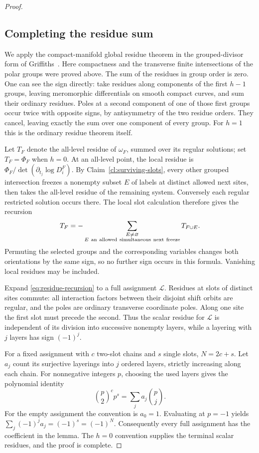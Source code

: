 \begin{proof}
\subsection{Completing the residue sum}

We apply the compact-manifold global residue theorem in the grouped-divisor
form of Griffiths~\cite[Section~III(a), Equation~(3.7)]{Griffiths1976Abel}.
Here compactness and the transverse finite intersections of the polar
groups were proved above. The sum of the residues in group order is zero.
One can see the sign directly: take residues along components of the
first $h-1$ groups, leaving meromorphic differentials on smooth compact
curves, and sum their ordinary residues. Poles at a second component
of one of those first groups occur twice with opposite signs, by
antisymmetry of the two residue orders. They cancel, leaving exactly
the sum over one component of every group. For $h=1$ this is the
ordinary residue theorem itself.

Let $T_F$ denote the all-level residue of $\omega_F$, summed over its
regular solutions; set $T_F=\Phi_F$ when $h=0$. At an all-level point,
the local residue is
$\Phi_F/\det(\partial_{t_j}\log D_i^F)$. By
Claim~\ref{cl:surviving-slots}, every other grouped intersection freezes
a nonempty subset $E$ of labels at distinct allowed next sites, then
takes the all-level residue of the remaining system. Conversely each
regular restricted solution occurs there. The local slot calculation
therefore gives the recursion
\begin{equation}\label{eq:residue-recursion}
 T_F=-\sum_{\substack{E\ne\varnothing\\
          E\ {\rm an\ allowed\ simultaneous\ next\ freeze}}}T_{F\cup E}.
\end{equation}
Permuting the selected groups and the corresponding variables changes
both orientations by the same sign, so no further sign occurs in this
formula. Vanishing local residues may be included.

Expand \eqref{eq:residue-recursion} to a full assignment $\mathcal L$.
Residues at slots of distinct sites commute: all interaction factors
between their disjoint shift orbits are regular, and the poles are
ordinary transverse coordinate poles. Along one site the first slot
must precede the second. Thus the scalar residue for $\mathcal L$ is
independent of its division into successive nonempty layers, while a
layering with $j$ layers has sign $(-1)^j$.

For a fixed assignment with $c$ two-slot chains and $s$ single slots,
$N=2c+s$. Let $a_j$ count its surjective layerings into $j$ ordered
layers, strictly increasing along each chain. For nonnegative integers
$p$, choosing the used layers gives the polynomial identity
\[
 \binom{p}{2}^{c}p^s=\sum_j a_j\binom{p}{j}.
\]
For the empty assignment the convention is $a_0=1$.
Evaluating at $p=-1$ yields
$\sum_j(-1)^j a_j=(-1)^s=(-1)^N$. Consequently every full assignment
has the coefficient in the lemma. The $h=0$ convention supplies the
terminal scalar residues, and the proof is complete.

\end{proof}

